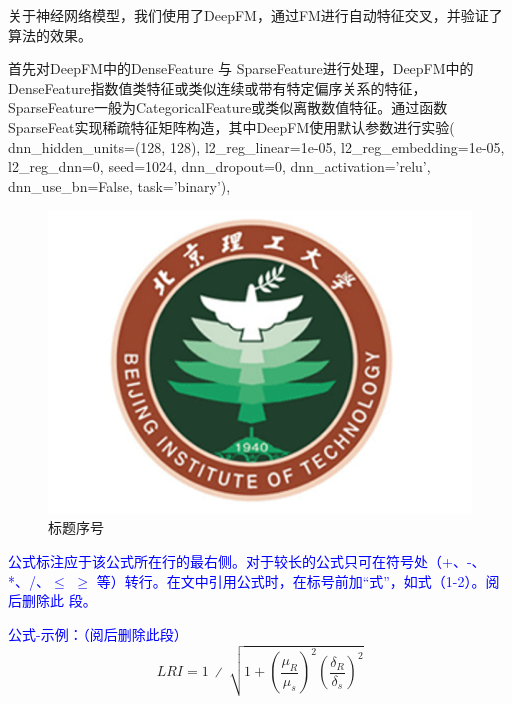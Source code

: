 关于神经网络模型，我们使用了DeepFM，通过FM进行自动特征交叉，并验证了算法的效果。

首先对DeepFM中的DenseFeature 与 SparseFeature进行处理，DeepFM中的DenseFeature指数值类特征或类似连续或带有特定偏序关系的特征，SparseFeature一般为CategoricalFeature或类似离散数值特征。通过函数SparseFeat实现稀疏特征矩阵构造，其中DeepFM使用默认参数进行实验(
dnn\_hidden\_units=(128, 128), l2\_reg\_linear=1e-05, l2\_reg\_embedding=1e-05, l2\_reg\_dnn=0, seed=1024, dnn\_dropout=0, dnn\_activation='relu', dnn\_use\_bn=False, task='binary'),


\begin{figure}[htbp]
  \vspace{13pt} %
  \centering
  \includegraphics[]{images/bit_logo.png}
  \caption{标题序号}\label{标题序号} %
\end{figure}

\textcolor{blue}{公式标注应于该公式所在行的最右侧。对于较长的公式只可在符号处（+、-、*、/、$\leqslant$ $\geqslant$ 等）转行。在文中引用公式时，在标号前加“式”，如式（1-2）。阅后删除此
段。}

\textcolor{blue}{公式-示例：（阅后删除此段）}
\begin{equation}
    LRI=1\ ∕\ \sqrt{1+{\left(\frac{{\mu }_{R}}{{\mu }_{s}}\right)}^{2}{\left(\frac{{\delta }_{R}}{{\delta }_{s}}\right)}^{2}}
\end{equation}
